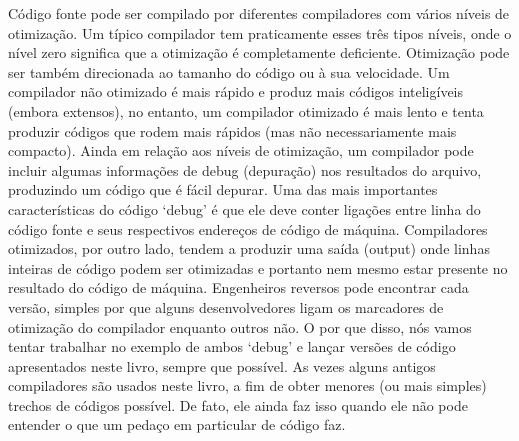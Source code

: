 Código fonte pode ser compilado por diferentes compiladores com vários níveis de otimização. Um típico compilador tem praticamente esses três tipos níveis, onde o nível zero significa que a otimização é completamente deficiente. Otimização pode ser também direcionada ao tamanho do código ou à sua velocidade. Um compilador não otimizado é mais rápido e produz mais  códigos inteligíveis (embora extensos), no entanto, um compilador otimizado é mais lento e tenta produzir códigos que rodem mais rápidos (mas não necessariamente mais compacto). Ainda em relação aos níveis de otimização, um compilador pode incluir algumas informações de debug (depuração) nos resultados do arquivo, produzindo um código  que é fácil depurar. Uma das mais importantes características do código ‘debug’ é que ele deve conter ligações entre linha do código fonte e seus respectivos endereços de código de máquina. Compiladores otimizados, por outro lado, tendem a produzir uma saída (output) onde linhas inteiras de código podem ser otimizadas e portanto nem mesmo estar presente no resultado do código de máquina. Engenheiros reversos pode encontrar cada versão, simples por que alguns desenvolvedores ligam os marcadores de otimização do compilador enquanto outros não. O por que disso, nós vamos tentar trabalhar no exemplo de ambos ‘debug’ e lançar versões de código apresentados neste livro, sempre que possível.
	As vezes alguns antigos compiladores são usados neste livro, a fim de obter menores (ou mais simples) trechos de códigos possível.
	De fato, ele ainda faz isso quando ele não pode entender o que um pedaço em particular de código faz.


